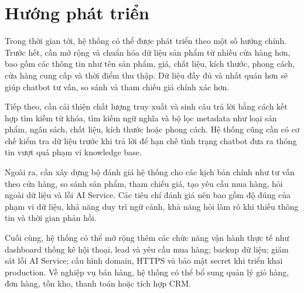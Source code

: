 \documentclass[../DoAn.tex]{subfiles}
\begin{document}
\section{Hướng phát triển}

Trong thời gian tới, hệ thống có thể được phát triển theo một số hướng chính. Trước hết, cần mở rộng và chuẩn hóa dữ liệu sản phẩm từ nhiều cửa hàng hơn, bao gồm các thông tin như tên sản phẩm, giá, chất liệu, kích thước, phong cách, cửa hàng cung cấp và thời điểm thu thập. Dữ liệu đầy đủ và nhất quán hơn sẽ giúp chatbot tư vấn, so sánh và tham chiếu giá chính xác hơn.

Tiếp theo, cần cải thiện chất lượng truy xuất và sinh câu trả lời bằng cách kết hợp tìm kiếm từ khóa, tìm kiếm ngữ nghĩa và bộ lọc metadata như loại sản phẩm, ngân sách, chất liệu, kích thước hoặc phong cách. Hệ thống cũng cần có cơ chế kiểm tra dữ liệu trước khi trả lời để hạn chế tình trạng chatbot đưa ra thông tin vượt quá phạm vi knowledge base.

Ngoài ra, cần xây dựng bộ đánh giá hệ thống cho các kịch bản chính như tư vấn theo cửa hàng, so sánh sản phẩm, tham chiếu giá, tạo yêu cầu mua hàng, hỏi ngoài dữ liệu và lỗi AI Service. Các tiêu chí đánh giá nên bao gồm độ đúng của phạm vi dữ liệu, khả năng duy trì ngữ cảnh, khả năng hỏi làm rõ khi thiếu thông tin và thời gian phản hồi.

Cuối cùng, hệ thống có thể mở rộng thêm các chức năng vận hành thực tế như dashboard thống kê hội thoại, lead và yêu cầu mua hàng; backup dữ liệu; giám sát lỗi AI Service; cấu hình domain, HTTPS và bảo mật secret khi triển khai production. Về nghiệp vụ bán hàng, hệ thống có thể bổ sung quản lý giỏ hàng, đơn hàng, tồn kho, thanh toán hoặc tích hợp CRM.
\end{document}
